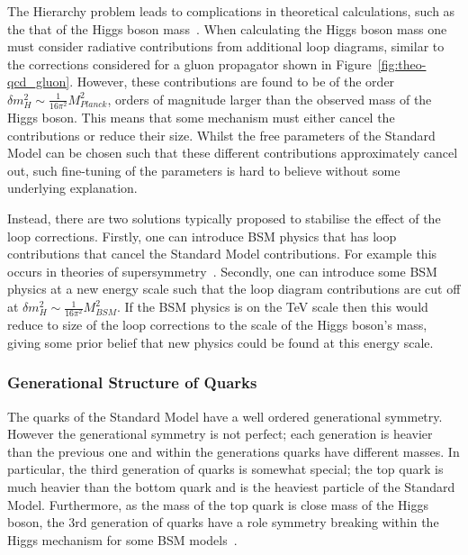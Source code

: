 The Hierarchy problem leads to complications in theoretical calculations, such as the that of the Higgs boson mass~\cite{theo-hierarchy}.
When calculating the Higgs boson mass one must consider
radiative contributions from additional loop diagrams,
similar to the corrections considered for a gluon propagator shown in Figure~\ref{fig:theo-qcd_gluon}. %
However, these contributions are found to be of the order $\delta m_H^2 \sim \frac{1}{16\pi^2} M_{Planck}^2$\hspace{0.2mm},
orders of magnitude larger than the observed mass of the Higgs boson.
This means that some mechanism must either cancel the contributions or reduce their size.
Whilst the free parameters of the Standard Model can be chosen such that these different contributions approximately cancel out,
such fine-tuning of the parameters is hard to believe without some underlying explanation.

Instead, there are two solutions typically proposed to stabilise the effect of the loop corrections.
Firstly, one can introduce BSM physics that has loop contributions that cancel the Standard Model contributions.
For example this occurs in theories of supersymmetry~\cite{theo-bsm_susy}.
Secondly, one can introduce some BSM physics at a new energy scale
such that the loop diagram contributions are cut off at $\delta m_H^2 \sim \frac{1}{16\pi^2} M_{BSM}^2$.
If the BSM physics is on the TeV scale then this would reduce to size of the loop corrections to the scale of the Higgs boson's mass,
giving some prior belief that new physics could be found at this energy scale.

\subsubsection{Generational Structure of Quarks}
\label{sec:theo-bsm_3g}

The quarks of the Standard Model have a well ordered generational symmetry.
However the generational symmetry is not perfect;
each generation is heavier than the previous one
and within the generations quarks have different masses.
In particular, the third generation of quarks is somewhat special;
the top quark is much heavier than the bottom quark
and is the heaviest particle of the Standard Model.
Furthermore, as the mass of the top quark is close mass of the Higgs boson,
the 3rd generation of quarks have a role symmetry breaking within the Higgs mechanism for some BSM models~\cite{theo-bsm_top}.

